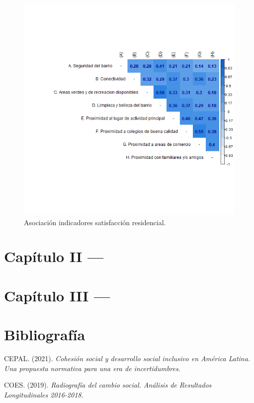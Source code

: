 \documentclass[
  12pt,
]{book}
\begin{document}
\begin{figure}[H]

{\centering \includegraphics[width=1\linewidth,height=1\textheight]{output/graphs/satisfaccion-residencial_cor} 

}

\caption{Asociación indicadores satisfacción residencial.}\label{fig:unnamed-chunk-9}
\end{figure}

\hypertarget{capuxedtulo-ii}{%
\chapter{Capítulo II ---}\label{capuxedtulo-ii}}

\hypertarget{capuxedtulo-iii}{%
\chapter{Capítulo III ---}\label{capuxedtulo-iii}}

\hypertarget{bibliografuxeda}{%
\chapter*{Bibliografía}\label{bibliografuxeda}}

\hypertarget{refs}{}
\leavevmode\hypertarget{ref-cepal_Cohesion_2021}{}%
CEPAL. (2021). \emph{Cohesión social y desarrollo social inclusivo en América Latina. Una propuesta normativa para una era de incertidumbres}.

\leavevmode\hypertarget{ref-coes_Radiografia_2019}{}%
COES. (2019). \emph{Radiografía del cambio social. Análisis de Resultados Longitudinales 2016-2018}.
\end{document}
